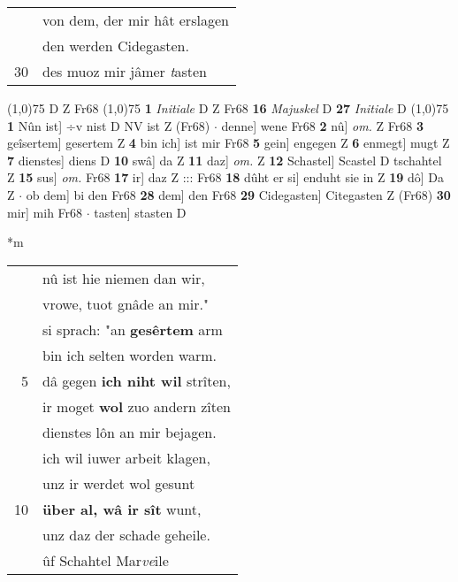 \documentclass[8pt,a4paper,notitlepage]{article}
\begin{document}
\begin{table}[ht]
\begin{minipage}[t]{0.5\linewidth}
\begin{tabular}{rl}
 & von dem, der mir hât erslagen\\ 
 & den werden Cidegasten.\\ 
30 & des muoz mir jâmer \textit{t}asten\\ 
\end{tabular}
\scriptsize
\line(1,0){75} \newline
D Z Fr68 \newline
\line(1,0){75} \newline
\textbf{1} \textit{Initiale} D Z Fr68  \textbf{16} \textit{Majuskel} D  \textbf{27} \textit{Initiale} D  \newline
\line(1,0){75} \newline
\textbf{1} Nûn ist] ÷v nist D NV ist Z (Fr68)  $\cdot$ denne] wene Fr68 \textbf{2} nû] \textit{om.} Z Fr68 \textbf{3} geîsertem] gesertem Z \textbf{4} bin ich] ist mir Fr68 \textbf{5} gein] engegen Z \textbf{6} enmegt] mugt Z \textbf{7} dienstes] diens D \textbf{10} swâ] da Z \textbf{11} daz] \textit{om.} Z \textbf{12} Schastel] Scastel D tschahtel Z \textbf{15} sus] \textit{om.} Fr68 \textbf{17} ir] daz Z ::: Fr68 \textbf{18} dûht er si] enduht sie in Z \textbf{19} dô] Da Z  $\cdot$ ob dem] bi den Fr68 \textbf{28} dem] den Fr68 \textbf{29} Cidegasten] Citegasten Z (Fr68) \textbf{30} mir] mih Fr68  $\cdot$ tasten] stasten D \newline
\end{minipage}
\hspace{0.5cm}
\begin{minipage}[t]{0.5\linewidth}
\small
\begin{center}*m
\end{center}
\begin{tabular}{rl}
 & nû ist hie niemen dan wir,\\ 
 & vrowe, tuot gnâde an mir."\\ 
 & si sprach: "an \textbf{gesêrtem} arm\\ 
 & bin ich selten worden warm.\\ 
5 & dâ gegen \textbf{ich niht wil} strîten,\\ 
 & ir moget \textbf{wol} zuo andern zîten\\ 
 & dienstes lôn an mir bejagen.\\ 
 & ich wil iuwer arbeit klagen,\\ 
 & unz ir werdet wol gesunt\\ 
10 & \textbf{über al, wâ ir sît} wunt,\\ 
 & unz daz der schade geheile.\\ 
 & ûf Schahtel Mar\textit{ve}ile\\ 

\end{tabular}
\end{minipage}
\end{table}
\end{document}
